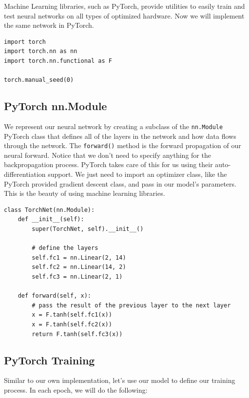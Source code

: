 \documentclass[openany]{book}
\begin{document}
Machine Learning libraries, such as PyTorch, provide utilities to easily
train and test neural networks on all types of optimized hardware. Now
we will implement the same network in PyTorch.

\begin{tcolorbox}
\tiny
\begin{verbatim}
import torch
import torch.nn as nn
import torch.nn.functional as F

torch.manual_seed(0)
\end{verbatim}
\end{tcolorbox}
        
    \subsection{PyTorch nn.Module}\label{pytorch-nn.module}

We represent our neural network by creating a subclass of the
\texttt{nn.Module} PyTorch class that defines all of the layers in the
network and how data flows through the network. The \texttt{forward()}
method is the forward propagation of our neural forward. Notice that we
don't need to specify anything for the backpropagation process. PyTorch
takes care of this for us using their auto-differentiation support. We
just need to import an optimizer class, like the PyTorch provided
gradient descent class, and pass in our model's parameters. This is the
beauty of using machine learning libraries.

\begin{tcolorbox}
\tiny
\begin{verbatim}
class TorchNet(nn.Module):
    def __init__(self):
        super(TorchNet, self).__init__()

        # define the layers
        self.fc1 = nn.Linear(2, 14)
        self.fc2 = nn.Linear(14, 2)
        self.fc3 = nn.Linear(2, 1)

    def forward(self, x):
        # pass the result of the previous layer to the next layer
        x = F.tanh(self.fc1(x))
        x = F.tanh(self.fc2(x))
        return F.tanh(self.fc3(x))
\end{verbatim}
\end{tcolorbox}

    \subsection{PyTorch Training}\label{pytorch-training}

Similar to our own implementation, let's use our model to define our
training process. In each epoch, we will do the following:
\end{document}
